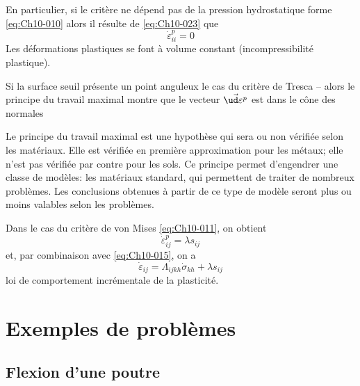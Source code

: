 En particulier, si le critère ne dépend pas de la pression hydrostatique forme \eqref{eq:Ch10-010} alors il résulte de \eqref{eq:Ch10-023} que 
\begin{equation}
    \dot{\varepsilon}_{ii}^p = 0
    \label{eq:Ch10-024}
\end{equation}
Les déformations plastiques se font à volume constant (incompressibilité plastique). 

Si la surface seuil présente un point anguleux le cas du critère de Tresca -- alors le principe du travail maximal montre que le vecteur $\vec{\ud \varepsilon^p}$ est dans le cône des normales  
\begin{center}
\end{center}

Le principe du travail maximal est une hypothèse qui sera ou non vérifiée selon les matériaux.
Elle est vérifiée en première approximation pour les métaux; elle n'est pas vérifiée par contre pour les sols.
Ce principe permet d'engendrer une classe de modèles: les matériaux standard, qui permettent de traiter de nombreux problèmes.
Les conclusions obtenues à partir de ce type de modèle seront plus ou moins valables selon les problèmes.

Dans le cas du critère de von Mises \eqref{eq:Ch10-011}, on obtient 
\begin{equation}
    \dot{\varepsilon}_{ij}^p = \lambda s_{ij}
    \label{eq:Ch10-025}
\end{equation}
et, par combinaison avec \eqref{eq:Ch10-015}, on a 
\begin{equation}
    \dot{\varepsilon}_{ij} = \Lambda_{ijkh} \dot{\sigma}_{kh} + \lambda s_{ij}
    \label{eq:Ch10-026}
\end{equation}
loi de comportement incrémentale de la plasticité. 

\section{Exemples de problèmes} \label{sec:Ch10-2}
\subsection{Flexion d'une poutre} \label{ssec:Ch10-2.1}
\endinput
Considérons un arbre êlastoplastique, et soumettons le à un moment 
de flexion 'TQ croissant (voir § VII. 1, l, problèmes 5 et 6). Au départ, la 
solution élastique du § VII.I.3 est valable, et elle le reste tant que 
(27) 

